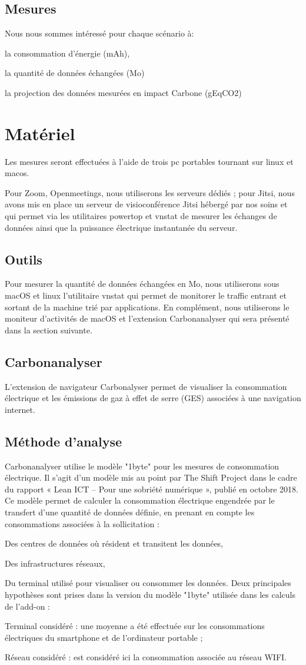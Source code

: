\documentclass[11pt,a4paper]{article}
\begin{document}
\subsection{Mesures}
Nous nous sommes intéressé pour chaque scénario à:
\bi \item la consommation d’énergie (mAh),
\item la quantité de données échangées (Mo)
\item la projection des données mesurées en impact Carbone (gEqCO2)
\ei
\section{Matériel}
Les mesures seront effectuées à l'aide de trois pc portables tournant sur linux et macos.

Pour Zoom, Openmeetings, nous utiliserons les serveurs dédiés ; pour Jitsi, nous avons mis en place un serveur de visioconférence Jitsi hébergé par nos soins et qui permet via les utilitaires powertop et vnstat de mesurer les échanges de données ainsi que la puissance électrique instantanée du serveur.
\subsection{Outils}
Pour mesurer la quantité de données échangées en Mo, nous utiliserons sous macOS et linux l'utilitaire vnstat qui permet de monitorer le traffic entrant et sortant de la machine trié par applications. En complément, nous utiliserons le moniteur d'activités de macOS et l'extension Carbonanalyser qui sera présenté dans la section suivante.
\subsection{Carbonanalyser}
L’extension de navigateur Carbonalyser permet de visualiser la consommation électrique et les émissions de gaz à effet de serre (GES) associées à une navigation internet.
\subsection*{Méthode d'analyse}
Carbonanalyser utilise le modèle "1byte" pour les mesures de consommation électrique. Il s'agit d'un modèle mis au point par The Shift Project dans le cadre du rapport « Lean ICT – Pour une sobriété numérique », publié en octobre 2018. Ce modèle permet de calculer la consommation électrique engendrée par le transfert d’une quantité de données définie, en prenant en compte les consommations associées à la sollicitation :
\bi \item Des centres de données où résident et transitent les données,
\item Des infrastructures réseaux,
\item Du terminal utilisé pour visualiser ou consommer les données. \ei
Deux principales hypothèses sont prises dans la version du modèle "1byte" utilisée dans les calculs de l’add-on :
\bi \item Terminal considéré : une moyenne a été effectuée sur les consommations électriques du smartphone et de l’ordinateur portable ;
\item Réseau considéré : est considéré ici la consommation associée au réseau WIFI.  \ei
\end{document}
